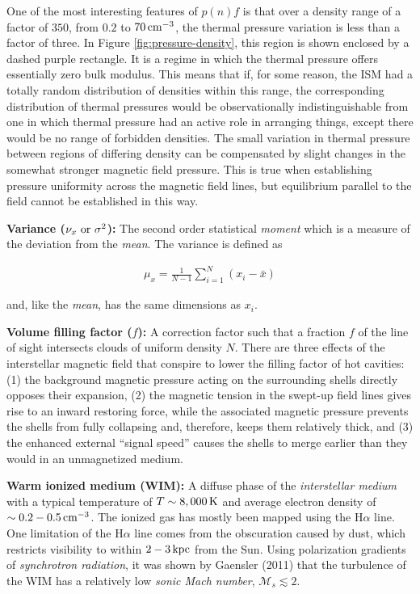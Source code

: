 \documentclass[a4paper,10pt]{article}
\begin{document}
{\noindent}One of the most interesting features of $p(n)f$ is that over a density range of a factor of $350$, from $0.2$ to $70\,{\rm cm^{-3}}$, the thermal pressure variation is less than a factor of three. In Figure \ref{fig:pressure-density}, this region is shown enclosed by a dashed purple rectangle. It is a regime in which the thermal pressure offers essentially zero bulk modulus. This means that if, for some reason, the ISM had a totally random distribution of densities within this range, the corresponding distribution of thermal pressures would be observationally indistinguishable from one in which thermal pressure had an active role in arranging things, except there would be no range of forbidden densities. The small variation in thermal pressure between regions of differing density can be compensated by slight changes in the somewhat stronger magnetic field pressure. This is true when establishing pressure uniformity across the magnetic field lines, but equilibrium parallel to the field cannot be established in this way.

{\noindent}\textbf{Variance ($\nu_x~{\rm or}~\sigma^2$):} The second order statistical \textit{moment} which is a measure of the deviation from the \textit{mean}. The variance is defined as

\begin{align*}
    \mu_x = \frac{1}{N-1} \sum_{i=1}^N (x_i-\bar{x})
\end{align*}

{\noindent}and, like the \textit{mean}, has the same dimensions as $x_i$.

{\noindent}\textbf{Volume filling factor ($f$):} A correction factor such that a fraction $f$ of the line of sight intersects clouds of uniform density $N$. There are three effects of the interstellar magnetic field that conspire to lower the filling factor of hot cavities: (1) the background magnetic pressure acting on the surrounding shells directly opposes their expansion, (2) the magnetic tension in the swept-up field lines gives rise to an inward restoring force, while the associated magnetic pressure prevents the shells from fully collapsing and, therefore, keeps them relatively thick, and (3) the enhanced external ``signal speed'' causes the shells to merge earlier than they would in an unmagnetized medium.

{\noindent}\textbf{Warm ionized medium (WIM):} A diffuse phase of the \textit{interstellar medium} with a typical temperature of $T\sim8,000\,{\rm K}$ and average electron density of $\sim0.2-0.5\,{\rm cm^{-3}}$.  The ionized gas has mostly been mapped using the H$\alpha$ line. One limitation of the H$\alpha$ line comes from the obscuration caused by dust, which restricts visibility to within $2-3\,{\rm kpc}$ from the Sun. Using polarization gradients of \textit{synchrotron radiation}, it was shown by Gaensler (2011) that the turbulence of the WIM has a relatively low \textit{sonic Mach number}, $\mathcal{M}_s\lesssim2$.
\end{document}
